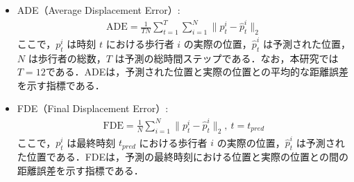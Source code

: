 \begin{itemize}
  \item ADE（Average Displacement Error）\cite{pellegrini2009you-eth}:
    \begin{align}
      \text{ADE} = \frac{1}{TN} \sum_{t=1}^{T} \sum_{i=1}^{N} \| p^i_t - \hat{p}^i_t \|_2
    \end{align}
    ここで，$p^i_t$ は時刻 $t$ における歩行者 $i$ の実際の位置，$\hat{p}^i_t$ は予測された位置，$N$ は歩行者の総数，$T$ は予測の総時間ステップである．なお，本研究では$T = 12$である．ADEは，予測された位置と実際の位置との平均的な距離誤差を示す指標である．
    \\
    \item FDE（Final Displacement Error）\cite{s-lstm}:
    \begin{align}
      \text{FDE} = \frac{1}{N} \sum_{i=1}^{N} \| p^i_t - \hat{p}^i_t \|_2 , \ t = t_{pred}
    \end{align}
    ここで，$p^i_t$ は最終時刻 $t_{pred}$ における歩行者 $i$ の実際の位置，$\hat{p}^i_t$ は予測された位置である．FDEは，予測の最終時刻における位置と実際の位置との間の距離誤差を示す指標である．
\end{itemize}

\newpage

